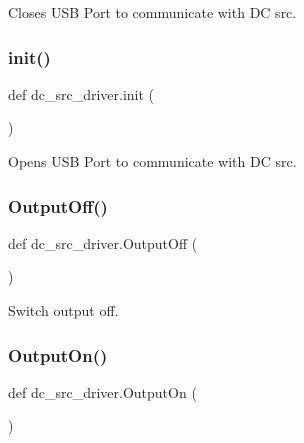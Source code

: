 \begin{DoxyVerb}Closes USB Port to communicate with DC src.
\end{DoxyVerb}
 \mbox{\label{namespacedc__src__driver_a11161defaf468cbc5cb08e4d8c69a7bf}} 
\subsubsection{\texorpdfstring{init()}{init()}}
{\footnotesize\ttfamily def dc\+\_\+src\+\_\+driver.\+init (\begin{DoxyParamCaption}{ }\end{DoxyParamCaption})}

\begin{DoxyVerb}Opens USB Port to communicate with DC src.
\end{DoxyVerb}
 \mbox{\label{namespacedc__src__driver_aba85f65b955b92de14da69217df9dcbf}} 
\subsubsection{\texorpdfstring{Output\+Off()}{OutputOff()}}
{\footnotesize\ttfamily def dc\+\_\+src\+\_\+driver.\+Output\+Off (\begin{DoxyParamCaption}{ }\end{DoxyParamCaption})}

\begin{DoxyVerb}Switch output off.
\end{DoxyVerb}
 \mbox{\label{namespacedc__src__driver_ac2775edfbf5423716a549ffd61dc5c28}} 
\subsubsection{\texorpdfstring{Output\+On()}{OutputOn()}}
{\footnotesize\ttfamily def dc\+\_\+src\+\_\+driver.\+Output\+On (\begin{DoxyParamCaption}{ }\end{DoxyParamCaption})}

